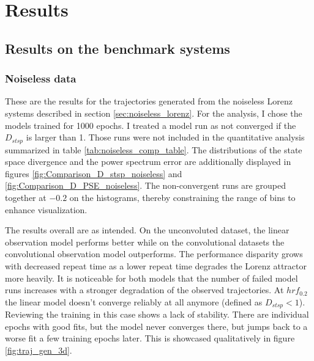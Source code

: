 \FloatBarrier
\chapter{Results} 

\section{Results on the benchmark systems}

\subsection{Noiseless data}

These are the results for the trajectories generated from the noiseless Lorenz systems described in section \ref{sec:noiseless_lorenz}.
For the analysis, I chose the models trained for 1000 epochs. I treated a model run as not converged if the 
$D_{stsp}$ is larger than 1. Those runs were not included in the quantitative analysis summarized in table \ref{tab:noiseless_comp_table}. The distributions 
of the state space divergence and the power spectrum error are additionally displayed in figures \ref{fig:Comparison_D_stsp_noiseless} and \ref{fig:Comparison_D_PSE_noiseless}. 
The non-convergent runs are grouped together at $-0.2$ on the histograms, thereby constraining the range of bins to enhance visualization.

The results overall are as intended. On the unconvoluted dataset, the linear observation model performs better while on the convolutional datasets the convolutional
observation model outperforms. The performance disparity grows with decreased repeat time as a lower repeat time degrades the Lorenz attractor more heavily. It is noticeable 
for both models that the number of failed model runs increases with a stronger degradation of the observed trajectories. At $hrf_{0.2}$ the linear model doesn't converge
reliably at all anymore (defined as $D_{stsp}<1$). Reviewing the training in this case shows a lack of stability. There are individual epochs with good fits, but the model 
never converges there, but jumps back to a worse fit a few training epochs later. This is showcased qualitatively in figure \ref{fig:traj_gen_3d}.

